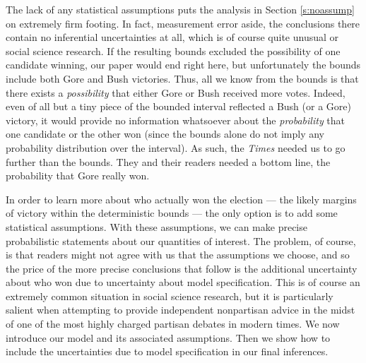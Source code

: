 \documentclass[11pt,titlepage]{article}
\begin{document}
The lack of any statistical assumptions puts the analysis in Section
\ref{s:noassump} on extremely firm footing.  In fact, measurement
error aside, the conclusions there contain no inferential
uncertainties at all, which is of course quite unusual or social
science research.  If the resulting bounds excluded the possibility of
one candidate winning, our paper would end right here, but
unfortunately the bounds include both Gore and Bush victories.  Thus,
all we know from the bounds is that there exists a \emph{possibility}
that either Gore or Bush received more votes.  Indeed, even of all but
a tiny piece of the bounded interval reflected a Bush (or a Gore)
victory, it would provide no information whatsoever about the
\emph{probability} that one candidate or the other won (since the
bounds alone do not imply any probability distribution over the
interval).  As such, the \emph{Times} needed us to go further than the
bounds.  They and their readers needed a bottom line, the probability
that Gore really won.

In order to learn more about who actually won the election --- the
likely margins of victory within the deterministic bounds --- the only
option is to add some statistical assumptions.  With these
assumptions, we can make precise probabilistic statements about our
quantities of interest.  The problem, of course, is that readers might
not agree with us that the assumptions we choose, and so the price of
the more precise conclusions that follow is the additional uncertainty
about who won due to uncertainty about model specification.  This is
of course an extremely common situation in social science research,
but it is particularly salient when attempting to provide independent
nonpartisan advice in the midst of one of the most highly charged
partisan debates in modern times.  We now introduce our model and its
associated assumptions.  Then we show how to include the uncertainties
due to model specification in our final inferences.
\end{document}
